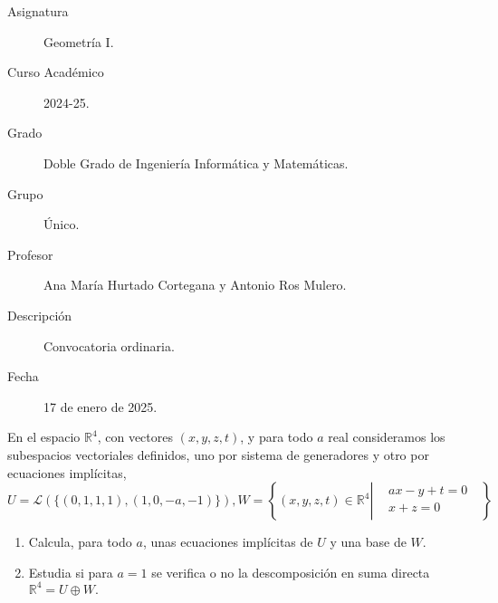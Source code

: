 \documentclass[12pt]{article}
\begin{document}
    \newcommand{\R}{{\mathbb{R}}} %
    \newcommand{\K}{{\mathbb{K}}} %
    
    

    \begin{description}
        \item[Asignatura] Geometría I.
        \item[Curso Académico] 2024-25.
        \item[Grado] Doble Grado de Ingeniería Informática y Matemáticas.
        \item[Grupo] Único.
        \item[Profesor] Ana María Hurtado Cortegana y Antonio Ros Mulero.
        \item[Descripción] Convocatoria ordinaria.
        \item[Fecha] 17 de enero de 2025.    
    \end{description}
    \newpage


    
    \begin{ejercicio}[2.5 puntos] En el espacio $\R^4$, con vectores $(x, y, z, t)$, y para todo $a$ real consideramos los subespacios vectoriales definidos, uno por sistema de generadores y otro por ecuaciones implícitas,
    \begin{equation*}
        U = \mathcal{L}(\{(0, 1, 1, 1), (1, 0, -a, -1)\}), W=\left\{(x, y, z, t) \in \R^4 \left|\begin{array}{rr}
             & ax-y + t = 0 \\
             & x + z = 0 \\
        \end{array}  \right. \text{ } \right\}
    \end{equation*}
    \begin{enumerate}[label=(\alph*)]        \item Calcula, para todo $a$, unas ecuaciones implícitas de $U$ y una base de $W$.
    \item Estudia si para $a = 1$ se verifica o no la descomposición en suma directa $\R^4 = U \oplus W.$ 
    
    \end{enumerate}
    \end{ejercicio}
    
\end{document}
